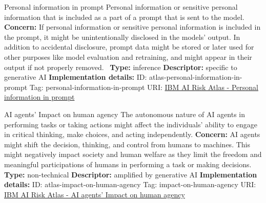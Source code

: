 \documentclass[a4paper,12pt]{article}
\begin{document}
\begin{definitionbox}{Personal information in prompt}
Personal information or sensitive personal information that is included as a part of a prompt that is sent to the model.\newline\newline
\textbf{Concern: }If personal information or sensitive personal information is included in the prompt, it might be unintentionally disclosed in the models' output. In addition to accidental disclosure, prompt data might be stored or later used for other purposes like model evaluation and retraining, and might appear in their output if not properly removed. \newline\newline
\textbf{Type: }inference\newline
\textbf{Descriptor: }specific to generative AI \newline\newline
\textbf{Implementation details: } \newline
ID: atlas-personal-information-in-prompt \newline
Tag: personal-information-in-prompt \newline
URI:  \href{https://www.ibm.com/docs/en/watsonx/saas?topic=SSYOK8/wsj/ai-risk-atlas/personal-information-in-prompt.html}{IBM AI Risk Atlas - Personal information in prompt}\newline
\end{definitionbox}
\begin{definitionbox}{AI agents' Impact on human agency}
The autonomous nature of AI agents in performing tasks or taking actions might affect the individuals' ability to engage in critical thinking, make choices, and acting independently.\newline\newline
\textbf{Concern: }AI agents might shift the decision, thinking, and control from humans to machines.  This might negatively impact society and human welfare as they limit the freedom and meaningful participations of humans in performing a task or making decisions.\newline\newline
\textbf{Type: }non-technical\newline
\textbf{Descriptor: }amplified by generative AI \newline\newline
\textbf{Implementation details: } \newline
ID: atlas-impact-on-human-agency \newline
Tag: impact-on-human-agency \newline
URI:  \href{https://www.ibm.com/docs/en/watsonx/saas?topic=SSYOK8/wsj/ai-risk-atlas/impact-on-human-agency.html}{IBM AI Risk Atlas - AI agents' Impact on human agency}\newline
\end{definitionbox}
\end{document}
